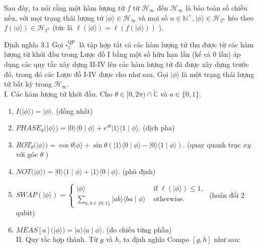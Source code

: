 \documentclass[10pt]{article}
\begin{document}
Sau đây, ta nói rằng một hàm lượng tử $f$ từ $\mathcal{H}_{\infty}$ đến $\mathcal{H}_{\infty}$ là bảo toàn số chiều nếu, với mọi trạng thái lượng tử $|\phi\rangle \in \mathcal{H}_{\infty}$ và mọi số $n \in \mathbb{N}^{+},|\phi\rangle \in \mathcal{H}_{2^{n}}$ kéo theo $f(|\phi\rangle) \in \mathcal{H}_{2^{n}}$ (tức là $\ell(|\phi\rangle)=\ell(f(|\phi\rangle))$ ).

Định nghĩa 3.1 Gọi $\square_{1}^{\text {QP }}$ là tập hợp tất cả các hàm lượng tử thu được từ các hàm lượng tử khởi đầu trong Lược đồ I bằng một số hữu hạn lần (kể cả 0 lần) áp dụng các quy tắc xây dựng II-IV lên các hàm lượng tử đã được xây dựng trước đó, trong đó các Lược đồ I-IV được cho như sau. Gọi $|\phi\rangle$ là một trạng thái lượng tử bất kỳ trong $\mathcal{H}_{\infty}$.\\
I. Các hàm lượng tử khởi đầu. Cho $\theta \in[0,2 \pi) \cap \tilde{\mathbb{C}}$ và $a \in\{0,1\}$.

\begin{enumerate}
  \item $I(|\phi\rangle)=|\phi\rangle$. (đồng nhất)
  \item $P H A S E_{\theta}(|\phi\rangle)=|0\rangle\langle 0 \mid \phi\rangle+e^{i \theta}|1\rangle\langle 1 \mid \phi\rangle$. (dịch pha)
  \item $R O T_{\theta}(|\phi\rangle)=\cos \theta|\phi\rangle+\sin \theta(|1\rangle\langle 0 \mid \phi\rangle-|0\rangle\langle 1 \mid \phi\rangle)$. (quay quanh trục $x y$ với góc $\theta$ )
  \item $N O T(|\phi\rangle)=|0\rangle\langle 1 \mid \phi\rangle+|1\rangle\langle 0 \mid \phi\rangle$. (phủ định)
  \item $S W A P(|\phi\rangle)=\left\{\begin{array}{ll}|\phi\rangle & \text { if } \ell(|\phi\rangle) \leq 1, \\ \sum_{a, b \in\{0,1\}}|a b\rangle\langle b a \mid \phi\rangle & \text { otherwise. }\end{array}\right.$ (hoán đổi 2 qubit)
  \item $M E A S[a](|\phi\rangle)=|a\rangle\langle a \mid \phi\rangle$. (đo chiếu từng phần)\\
II. Quy tắc hợp thành. Từ $g$ và $h$, ta định nghĩa Compo $[g, h]$ như sau:
\end{enumerate}
\end{document}
